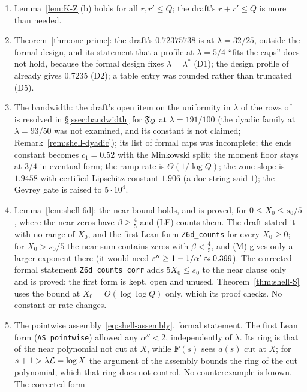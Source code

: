 \begin{enumerate}
$E_2^2/U\le86\,\lambda\Lc/T$ and $2E_2/\sqrt U\le26.3(\Lc/T)^{1/2}$ (D4). The step $\sum_n\abs{\tilde{\mathfrak m}(n)}^2\ge U-1$ was asserted
without proof and is written out here.
\item Lemma~\ref{lem:K-Z}(b) holds for all $r,r'\le Q$; the draft's $r+r'\le Q$ is more than needed.
\item Theorem~\ref{thm:one-prime}: the draft's $0.72375738$ is at $\lambda=32/25$, outside the formal design, and its statement that a profile at $\lambda=5/4$ ``fits the
caps'' does not hold, because the formal design fixes $\lambda=\lambda^*$ (D1); the design profile of~\cite{DSouza} already gives $0.7235$ (D2); a table entry was rounded
rather than truncated (D5).
\item The bandwidth: the draft's open item on the uniformity in $\lambda$ of the rows of~\cite[\S\S7--10]{DSouza} is resolved in \S\ref{ssec:bandwidth} for $\mathfrak F_Q$ at
$\lambda=191/100$ (the dyadic family at $\lambda=93/50$ was not examined, and its constant is not claimed; Remark~\ref{rem:shell-dyadic}); its list of
formal caps was incomplete; the ends constant becomes $c_1=0.52$ with the Minkowski split; the moment floor stays at $3/4$ in eventual form; the ramp rate is
$\Theta(1/\log Q)$; the zone slope is $1.9458$ with certified Lipschitz constant $1.906$ (a doc-string said $1$); the Gevrey gate is raised to $5\cdot10^4$.
\item Lemma~\ref{lem:shell-6d}: the near bound holds, and is proved, for $0\le X_0\le s_0/5$, where the near zeros have $\beta\ge\frac45$ and (LF) counts them.
The draft stated it with no range of $X_0$, and the first Lean form \texttt{Z6d\_counts} for every $X_0\ge0$; for $X_0>s_0/5$ the near sum contains zeros
with $\beta<\frac45$, and (M) gives only a larger exponent there (it would need $\varepsilon''\ge1-1/\alpha'\approx0.399$). The corrected formal statement
\texttt{Z6d\_counts\_corr} adds $5X_0\le s_0$ to the near clause only and is proved; the first form is kept, open and unused.
Theorem~\ref{thm:shell-S} uses the bound at $X_0=O(\log\log Q)$ only, which its proof checks. No constant or rate changes.
\item The pointwise assembly~\eqref{eq:shell-assembly}, formal statement. The first Lean form (\texttt{AS\_pointwise}) allowed any $\alpha''<2$,
independently of $\lambda$. Its ring is that of the near polynomial not cut at $X$, while $\mathbf F(s)$ sees $a(s)$ cut at $X$; for $s+1>\lambda\mathcal L=\log X$
the argument of the assembly bounds the ring of the cut polynomial, which that ring does not control. No counterexample is known. The corrected form

\end{enumerate}
